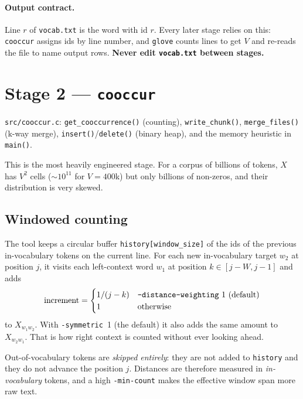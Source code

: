 \documentclass[11pt,a4paper]{article}
\newcommand{\file}[1]{\texttt{#1}}
\newcommand{\fn}[1]{\texttt{#1()}}
\newcommand{\opt}[1]{\texttt{-#1}}
\begin{document}
\paragraph{Output contract.} Line $r$ of \file{vocab.txt} is the word with id $r$.
Every later stage relies on this: \texttt{cooccur} assigns ids by line number, and
\texttt{glove} counts lines to get $V$ and re-reads the file to name output rows.
\textbf{Never edit \file{vocab.txt} between stages.}

\section{Stage 2 --- \texttt{cooccur}}

\begin{codeloc}
\file{src/cooccur.c}: \fn{get\_cooccurrence} (counting), \fn{write\_chunk},
\fn{merge\_files} (k-way merge), \fn{insert}/\fn{delete} (binary heap), and the
memory heuristic in \fn{main}.
\end{codeloc}

This is the most heavily engineered stage. For a corpus of billions of tokens, $X$ has
$V^2$ cells ($\sim10^{11}$ for $V=400$k) but only billions of non-zeros, and their
distribution is very skewed.

\subsection{Windowed counting}

The tool keeps a circular buffer \texttt{history[window\_size]} of the ids of the previous
in-vocabulary tokens on the current line. For each new in-vocabulary target $w_2$ at
position $j$, it visits each left-context word $w_1$ at position $k\in[j-W, j-1]$ and adds
\[
  \text{increment} = \begin{cases}1/(j-k) & \text{\opt{distance-weighting} 1 (default)}\\ 1 & \text{otherwise}\end{cases}
\]
to $X_{w_1 w_2}$. With \opt{symmetric}~1 (the default) it also adds the same amount to
$X_{w_2 w_1}$. That is how right context is counted without ever looking ahead.

\begin{pitfall}
Out-of-vocabulary tokens are \emph{skipped entirely}: they are not added to
\texttt{history} and they do not advance the position $j$. Distances are therefore
measured in \emph{in-vocabulary} tokens, and a high \opt{min-count} makes the effective
window span more raw text.
\end{pitfall}
\end{document}

